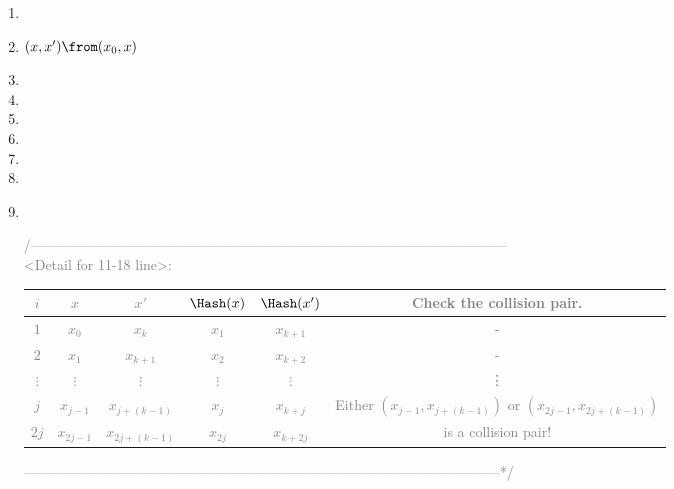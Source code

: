 \documentclass[12pt,openany]{book}
\theoremstyle{definition}
\begin{document}
\begin{tcolorbox}[title=\textbf{Algorithm.}\ Small-Space Attack, coltitle=black, colback=white,colframe=-red, breakable, enhanced]
\begin{enumerate}[$1$:]
{				\\ ------------------------------------------------------------------------------------------------------*\slash}
			\item[]
			\textcolor{gray}{}
			\item $(x,x')\from(x_0,x)$\quad \textcolor{gray}{}
			\item {}
			\item \qquad{}
			\item \qquad\qquad{}
			\item \qquad{}
			\item \qquad\qquad{$(x,x')\from\left(\Hash(x),\Hash(x')\right)$}
			\item \qquad{}
			\item {}\\
			\newpage
			\textcolor{gray}{\slash*------------------------------------------------------------------------------------------------------\\
				<Detail for 11-18 line>: \begin{center}
					\begin{tabular}{c||cc|cc||c}
						\toprule[1.5pt]
						$i$ & $x$ & $x'$&$\Hash(x)$& $\Hash(x')$ & Check the collision pair.\\
						\midrule
						$1$& $x_0$& $x_k$ &$x_1$&$x_{k+1}$&-\\
						\hline
						$2$& $x_1$& $x_{k+1}$ &$x_2$&$x_{k+2}$&-\\
						\hline
						$\vdots$& $\vdots$& $\vdots$ &$\vdots$&$\vdots$&\vdots\\
						\hline
						{$j$} & $x_{j-1}$& $x_{j+(k-1)}$ &$x_j$&$x_{k+j}$&{Either $(x_{j-1},x_{j+(k-1)})$ or $(x_{2j-1},x_{2j+(k-1)})$}\\
						{$2j$} & $x_{2j-1}$& $x_{2j+(k-1)}$ &$x_{2j}$&$x_{k+2j}$& is a collision pair!\\
						\bottomrule[1.5pt]
					\end{tabular}
				\end{center} ------------------------------------------------------------------------------------------------------*\slash}
		\end{enumerate}
	\end{tcolorbox}
	\fi
\end{document}
